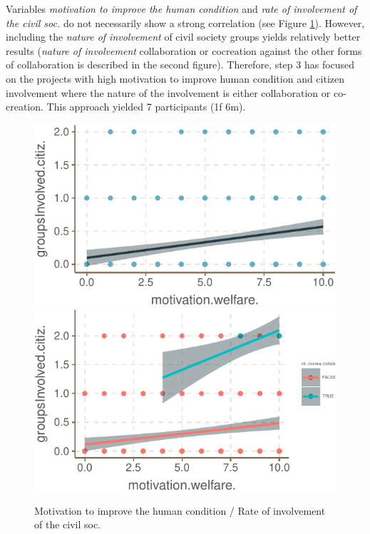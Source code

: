 \documentclass[]{tufte-book}
\begin{document}
Variables \emph{motivation to improve the human condition} and
\emph{rate of involvement of the civil soc.} do not necessarily show a
strong correlation (see Figure \ref{fig:wf}). However, including
the \emph{nature of involvement} of civil society groups yields
relatively better results (\emph{nature of involvement} collaboration or
cocreation against the other forms of collaboration is described in the
second figure). Therefore, step 3 has focused on the projects with high
motivation to improve human condition and citizen involvement where the
nature of the involvement is either collaboration or co-creation. This
approach yielded 7 participants (1f \textbar{} 6m).

\begin{figure}
 \includegraphics{SIVOCS_int-cand_files/figure-latex/wf_gi_lm-1}
\includegraphics{SIVOCS_int-cand_files/figure-latex/wf_gi_lm-2}
\caption{Motivation to improve the human condition / Rate of involvement of the
civil soc.}
\label{fig:wf}
\end{figure}
\end{document}
